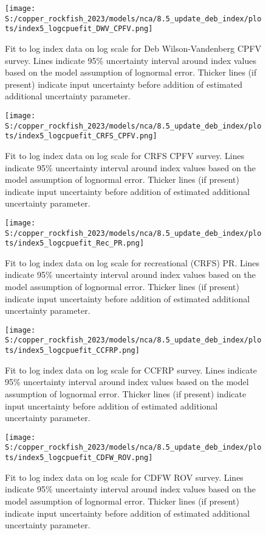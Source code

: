 \documentclass[11pt,
  english,
  letterpaper,
]{article}
\begin{document}
\begin{figure}
\centering
\texttt{[image: S:/copper\_rockfish\_2023/models/nca/8.5\_update\_deb\_index/plots/index5\_logcpuefit\_DWV\_CPFV.png]}
\caption{Fit to log index data on log scale for Deb Wilson-Vandenberg CPFV survey. Lines indicate 95\% uncertainty interval around index values based on the model assumption of lognormal error. Thicker lines (if present) indicate input uncertainty before addition of estimated additional uncertainty parameter.\label{fig:dwv-cpfv-index-fit}}
\end{figure}

\begin{figure}
\centering
\texttt{[image: S:/copper\_rockfish\_2023/models/nca/8.5\_update\_deb\_index/plots/index5\_logcpuefit\_CRFS\_CPFV.png]}
\caption{Fit to log index data on log scale for CRFS CPFV survey. Lines indicate 95\% uncertainty interval around index values based on the model assumption of lognormal error. Thicker lines (if present) indicate input uncertainty before addition of estimated additional uncertainty parameter.\label{fig:crfs-cpfv-index-fit}}
\end{figure}

\begin{figure}
\centering
\texttt{[image: S:/copper\_rockfish\_2023/models/nca/8.5\_update\_deb\_index/plots/index5\_logcpuefit\_Rec\_PR.png]}
\caption{Fit to log index data on log scale for recreational (CRFS) PR. Lines indicate 95\% uncertainty interval around index values based on the model assumption of lognormal error. Thicker lines (if present) indicate input uncertainty before addition of estimated additional uncertainty parameter.\label{fig:crfs-pr-index-fit}}
\end{figure}

\begin{figure}
\centering
\texttt{[image: S:/copper\_rockfish\_2023/models/nca/8.5\_update\_deb\_index/plots/index5\_logcpuefit\_CCFRP.png]}
\caption{Fit to log index data on log scale for CCFRP survey. Lines indicate 95\% uncertainty interval around index values based on the model assumption of lognormal error. Thicker lines (if present) indicate input uncertainty before addition of estimated additional uncertainty parameter.\label{fig:ccfrp-index-fit}}
\end{figure}

\begin{figure}
\centering
\texttt{[image: S:/copper\_rockfish\_2023/models/nca/8.5\_update\_deb\_index/plots/index5\_logcpuefit\_CDFW\_ROV.png]}
\caption{Fit to log index data on log scale for CDFW ROV survey. Lines indicate 95\% uncertainty interval around index values based on the model assumption of lognormal error. Thicker lines (if present) indicate input uncertainty before addition of estimated additional uncertainty parameter.\label{fig:rov-index-fit}}
\end{figure}
\end{document}
